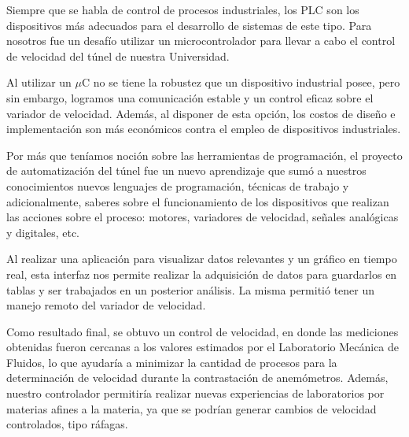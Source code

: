 Siempre que se habla de control de procesos industriales, los PLC son los dispositivos más adecuados para el desarrollo de sistemas de este tipo. Para nosotros fue un desafío utilizar un microcontrolador para llevar a cabo el control de velocidad del túnel de nuestra Universidad.

Al utilizar un $\mu$C no se tiene la robustez que un dispositivo industrial posee, pero sin embargo, logramos una comunicación estable y un control eficaz sobre el variador de velocidad. Además, al disponer de esta opción, los costos de diseño e implementación son más económicos contra el empleo de dispositivos industriales.

Por más que teníamos noción sobre las herramientas de programación, el proyecto de automatización del túnel fue un nuevo aprendizaje que sumó a nuestros conocimientos nuevos lenguajes de programación, técnicas de trabajo y adicionalmente, saberes sobre el funcionamiento de los dispositivos que realizan las acciones sobre el proceso: motores, variadores de velocidad, señales analógicas y digitales, etc. 

Al realizar una aplicación para visualizar datos relevantes y un gráfico en tiempo real, esta interfaz nos permite realizar la adquisición de datos para guardarlos en tablas y ser trabajados en un posterior análisis. La misma permitió tener un manejo remoto del variador de velocidad.

Como resultado final, se obtuvo un control de velocidad, en donde las mediciones obtenidas fueron cercanas a los valores estimados por el Laboratorio Mecánica de Fluidos, lo que ayudaría a minimizar la cantidad de procesos para la determinación de velocidad durante la contrastación de anemómetros. Además, nuestro controlador permitiría realizar nuevas experiencias de laboratorios por materias afines a la materia, ya que se podrían generar cambios de velocidad controlados, tipo ráfagas.

